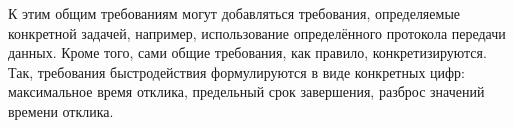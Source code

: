 \documentclass[a4paper, 14pt]{extarticle}
\begin{document}
  К этим общим требованиям могут добавляться требования, определяемые конкретной задачей, например,
  использование определённого протокола передачи данных. Кроме того, сами общие требования, как
  правило, конкретизируются. Так, требования быстродействия формулируются в виде конкретных цифр:
  максимальное время отклика, предельный срок завершения, разброс значений времени отклика.



\end{document}
